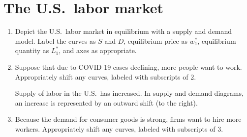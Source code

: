 \documentclass[
    letterpaper,paper=portrait,fleqn,
    DIV=16,fontsize=12pt,twoside=semi,
    parskip=full-,
    headings=standardclasses]
{scrartcl}
\begin{document}
\section{The U.S.~labor market}

\begin{enumerate}

\item Depict the U.S.~labor market in equilibrium with a supply and demand model. Label the curves as $S$ and $D$, equilibrium price as $w^*_1$, equilibrium quantity as $L^*_1$, and axes as appropriate.

\begin{solution}
\begin{center}
\end{center}
\vspace{-12pt}
\end{solution}

\item Suppose that due to COVID-19 cases declining, more people want to work. Appropriately shift any curves, labeled with subscripts of 2.

\begin{solution}
Supply of labor in the U.S.~has increased. In supply and demand diagrams, an increase is represented by an outward shift (to the right).

\begin{center}
\end{center}
\vspace{-12pt}
\end{solution}

\item Because the demand for consumer goods is strong, firms want to hire more workers. Appropriately shift any curves, labeled with subscripts of 3.


\end{enumerate}
\end{document}
